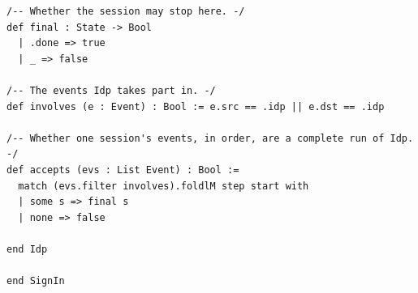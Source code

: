 \begin{lstlisting}[language={},basicstyle=\ttfamily\scriptsize,breaklines=true]
/-- Whether the session may stop here. -/
def final : State -> Bool
  | .done => true
  | _ => false

/-- The events Idp takes part in. -/
def involves (e : Event) : Bool := e.src == .idp || e.dst == .idp

/-- Whether one session's events, in order, are a complete run of Idp. -/
def accepts (evs : List Event) : Bool :=
  match (evs.filter involves).foldlM step start with
  | some s => final s
  | none => false

end Idp

end SignIn
\end{lstlisting}
